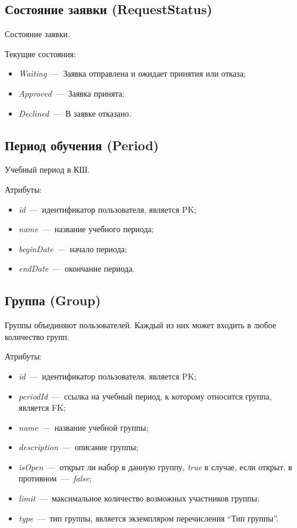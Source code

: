 \documentclass[14pt]{article}
\begin{document}

\subsection{Состояние заявки (RequestStatus)}

Состояние заявки.

Текущие состояния:
\begin{itemize}
	\item \emph{Waiting}~---~Заявка отправлена и ожидает принятия или отказа;
	\item \emph{Approved}~---~Заявка принята;
	\item \emph{Declined}~---~В заявке отказано.
\end{itemize}

\subsection{Период обучения (Period)}

Учебный период в КШ.

Атрибуты:
\begin{itemize}
	\item \emph{id}~---~идентификатор пользователя, является PK;
	\item \emph{name}~---~название учебного периода;
	\item \emph{beginDate}~---~начало периода;
	\item \emph{endDate}~---~окончание периода.
\end{itemize}
	
\subsection{Группа (Group)}

Группы объединяют пользователей. Каждый из них может входить в любое количество групп.

Атрибуты:
\begin{itemize}
	\item \emph{id}~---~идентификатор пользователя, является PK;
	\item \emph{periodId}~---~ссылка на учебный период, к которому относится группа, является FK;
	\item \emph{name}~---~название учебной группы;
	\item \emph{description}~---~описание группы;
	\item \emph{isOpen}~---~открыт ли набор в данную группу, \emph{true} в случае, если открыт, в противном~---~\emph{false};
	\item \emph{limit}~---~максимальное количество возможных участников группы;	
	\item \emph{type}~---~тип группы, является экземпляром перечисления ``Тип группы''.
\end{itemize}
\end{document}
